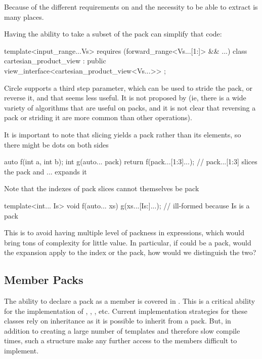 \documentclass{wg21}
\begin{document}
Because of the different requirements on  and the necessity to be able to extract 
is many places.

Having the ability to take a subset of the pack can simplify that code:

\begin{colorblock}
template<input_range...Vs>
requires (forward_range<Vs...[1:]> && ...)
class cartesian_product_view : public view_interface<cartesian_product_view<Vs...>> {};
\end{colorblock}


Circle supports a third step parameter, which can be used to stride the pack, or reverse it,
and that seems less useful. It is not proposed by  (ie, there is a wide variety of algorithms that
are useful on packs, and it is not clear that reversing a pack or striding it are more common than other operations).

It is important to note that slicing yields a pack rather than its elements, so there might be dots on both sides

\begin{colorblock}
auto f(int a, int b);
int g(auto... pack) {
    return f(pack...[1:3]...); // pack...[1:3] slices the pack and ... expands it
}
\end{colorblock}

Note that the indexes of pack slices cannot themselves be pack

\begin{colorblock}
template<int... Is>
void f(auto... xs) {
    g(xs...[Is:]...); // ill-formed because Is is a pack
}
\end{colorblock}

This is to avoid having multiple level of packness in expressions, which would bring tons of complexity for little value.
In particular, if  could be a pack, would the expansion apply to the index or the pack, how would we distinguish the two?

\subsection{Member Packs}

The ability to declare a pack as a member is covered in .
This is a critical ability for the implementation of , , , etc.
Current implementation strategies for these classes rely on inheritance as it is possible to inherit from a pack.
But, in addition to creating a large number of templates and therefore slow compile times, such a structure make any further access to the members
difficult to implement.
\end{document}
